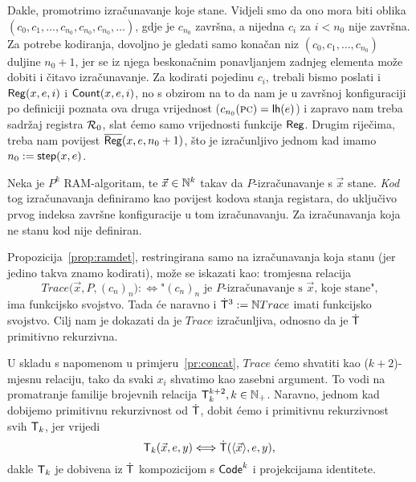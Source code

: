 Dakle, promotrimo izračunavanje koje stane. Vidjeli smo da ono mora biti oblika $(c_0,c_1,\dotsc,c_{n_0},c_{n_0},c_{n_0},\dotsc)$, gdje je $c_{n_0}$ završna, a nijedna $c_i$ za $i<n_0$ nije završna. Za potrebe kodiranja, dovoljno je gledati samo konačan niz $(c_0,c_1,\dotsc,c_{n_0})$ duljine $n_0+1$, jer se iz njega beskonačnim ponavljanjem zadnjeg elementa može dobiti i čitavo izračunavanje. Za kodirati pojedinu $c_i$, trebali bismo poslati i $\mathsf{Reg}(x,e,i)$ i $\mathsf{Count}(x,e,i)$, no s obzirom na to da nam je u završnoj konfiguraciji po definiciji poznata ova druga vrijednost ($c_{n_0}(\textsc{pc})=\mathsf{lh}(e)$) i zapravo nam treba sadržaj registra $\mathcal R_{0}$, slat ćemo samo vrijednosti funkcije $\mathsf{Reg}$. Drugim riječima, treba nam povijest $\overline{\mathsf{Reg}}(x,e,n_0+1)$, što je izračunljivo jednom kad imamo $n_0:=\mathsf{step}(x,e)$.

\begin{definicija}\label{def:kodizr}
Neka je $P^k$ RAM-algoritam, te $\vec x\in{\mathbb N}^k$ takav da $P$-izračunavanje s $\vec x$ stane. \emph{Kod} tog izračunavanja definiramo kao povijest kodova stanja registara, do uključivo prvog indeksa završne konfiguracije u tom izračunavanju. Za izračunavanja koja ne stanu kod nije definiran.
\end{definicija}

Propozicija~\ref{prop:ramdet}, restringirana samo na izračunavanja koja stanu (jer jedino takva znamo kodirati), može se iskazati kao: tromjesna relacija \begin{equation}\label{eq:Trace}
    Trace\bigl(\vec x,P,(c_n)_n\bigr):\Longleftrightarrow\text{"$(c_n)_n$ je $P$-izračunavanje s $\vec x$, koje stane",}
\end{equation}
ima funkcijsko svojstvo. Tada će naravno i $\mathsf{\dot T}^3:={\mathbb N} Trace$ imati funkcijsko svojstvo. Cilj nam je dokazati da je $Trace$ izračunljiva, odnosno da je $\mathsf{\dot T}$ primitivno rekurzivna.

U skladu s napomenom u primjeru~\ref{pr:concat}, $Trace$ ćemo shvatiti kao ($k+2$)-mjesnu relaciju, tako da svaki $x_i$ shvatimo kao zasebni argument. To vodi na promatranje familije brojevnih relacija $\mathsf T_k^{k+2},k\in{\mathbb N}_+$. Naravno, jednom kad dobijemo primitivnu rekurzivnost od $\mathsf{\dot T}$, dobit ćemo i primitivnu rekurzivnost svih $\mathsf T_k$, jer vrijedi
\begin{equation}\label{eq:TkviadotT}
\mathsf T_k(\vec x,e,y)\Longleftrightarrow\mathsf{\dot T}(\langle\vec x\rangle,e,y)\text,
\end{equation}
dakle $\mathsf T_k$ je dobivena iz $\mathsf{\dot T}$ kompozicijom s $\mathsf{Code}^k$ i projekcijama identitete.

